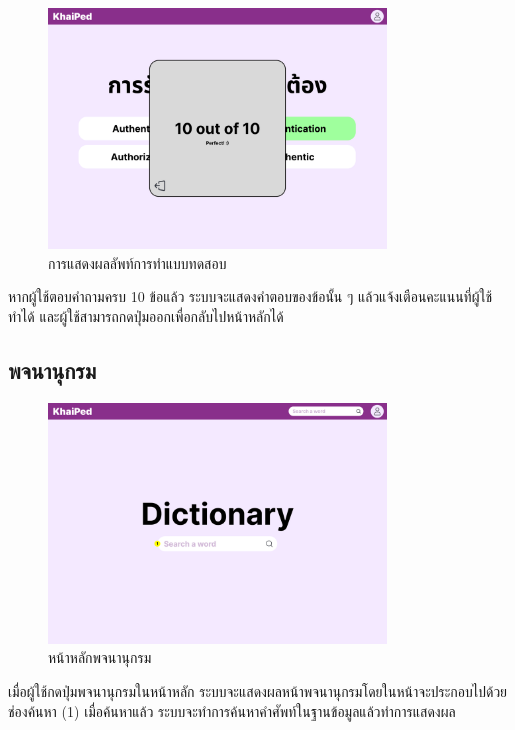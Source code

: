 \documentclass[12pt,oneside,openright,a4paper]{cpe-thai-project}
\begin{document}
\begin{figure}[!h]\centering
	\includegraphics[width=0.8\textwidth, keepaspectratio=true]{image/chap3/ui/quiz/Quiz - Result.png}
	\caption{การแสดงผลลัพท์การทำแบบทดสอบ}\label{fig:UI_QuizResult}
\end{figure}
\hspace{1cm}
หากผู้ใช้ตอบคำถามครบ 10 ข้อแล้ว ระบบจะแสดงคำตอบของข้อนั้น ๆ แล้วแจ้งเตือนคะแนนที่ผู้ใช้ทำได้ และผู้ใช้สามารถกดปุ่มออกเพื่อกลับไปหน้าหลักได้

\pagebreak
\subsection{พจนานุกรม}
\begin{figure}[!h]\centering
	\includegraphics[width=0.8\textwidth, keepaspectratio=true]{image/chap3/ui/dict/Dictionary.png}
	\caption{หน้าหลักพจนานุกรม}\label{fig:UI_Dictionary}
\end{figure}
\hspace{1cm}
เมื่อผู้ใช้กดปุ่มพจนานุกรมในหน้าหลัก ระบบจะแสดงผลหน้าพจนานุกรมโดยในหน้าจะประกอบไปด้วยช่องค้นหา (1) เมื่อค้นหาแล้ว ระบบจะทำการค้นหาคำศัพท์ในฐานข้อมูลแล้วทำการแสดงผล
\end{document}
